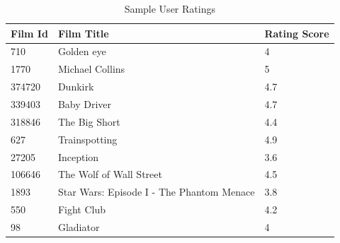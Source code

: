 \begin{table}[H]
    \centering
    \begin{tabular}{p{} p{} p{}}
    \hline
    \textbf{Film Id} & \textbf{Film Title} & \textbf{Rating Score} \\ \hline
    710 & Golden eye & 4 \\
    1770 & Michael Collins & 5 \\
    374720 & Dunkirk & 4.7 \\
    339403 & Baby Driver & 4.7 \\
    318846 & The Big Short & 4.4 \\
    627 & Trainspotting & 4.9 \\
    27205 & Inception & 3.6 \\
    106646 & The Wolf of Wall Street & 4.5 \\
    1893 & Star Wars: Episode I - The Phantom Menace & 3.8 \\
    550 & Fight Club & 4.2 \\
    98 & Gladiator & 4 \\ \hline
    \end{tabular}
    \caption{Sample User Ratings}
    \label{tab:sample_user_ratings}
    \end{table}
    